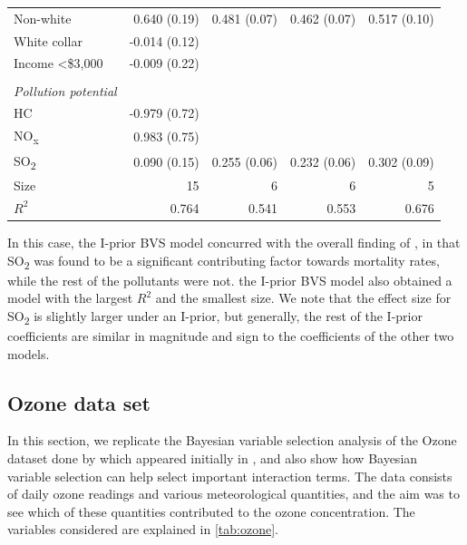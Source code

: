 \documentclass[showframe,11pt,twoside,openright]{report}
\begin{document}
\begin{table}[htb]
\begin{tabular}{lrrrr}
\hspace{0.5em} Non-white             & 0.640 (0.19)                 & 0.481 (0.07)   & 0.462 (0.07)      &  0.517 (0.10)       \\
\hspace{0.5em} White collar          & {\color{grymath} -0.014 (0.12)} &                &                   &         \\
\hspace{0.5em} Income <\$3,000         & {\color{grymath} -0.009 (0.22)} &                &                   &         \\
\\
\emph{Pollution potential} \\
\hspace{0.5em} HC    & {\color{grymath} -0.979 (0.72)} &                &                   &         \\
\hspace{0.5em} NO\textsubscript{x} & {\color{grymath} 0.983 (0.75)}  &                &                   &         \\
\hspace{0.5em}  SO\textsubscript{2} & {\color{grymath} 0.090 (0.15)}  & 0.255 (0.06)   & 0.232 (0.06)      &  0.302 (0.09)        \\
\midrule
Size                     & 15                           & 6              & 6                 & 5         \\
$R^2$                    & 0.764                        & 0.541          & 0.553             & 0.676        \\ \bottomrule
\end{tabular}
\end{table}

In this case, the I-prior BVS model concurred with the overall finding of \citet{McDonald1973}, in that SO\textsubscript{2} was found to be a significant contributing factor towards mortality rates, while the rest of the pollutants were not.
the I-prior BVS model also obtained a model with the largest $R^2$ and the smallest size.
We note that the effect size for SO\textsubscript{2} is slightly larger under an I-prior, but generally, the rest of the I-prior coefficients are similar in magnitude and sign to the coefficients of the other two models.

\vspace{-0.5em}
\subsection{Ozone data set}
\label{sec:ozone}
\vspace{-0.5em}
In this section, we replicate the Bayesian variable selection analysis of the Ozone dataset done by \citet[abbr. C\&M]{Casella2006} which appeared initially in \citet[abbr. B\&F]{Breiman1985}, and also show how Bayesian variable selection can help select important interaction terms. 
The data consists of daily ozone readings and various meteorological quantities, and the aim was to see which of these quantities contributed to the ozone concentration. 
The variables considered are explained in \cref{tab:ozone}. 
\end{document}
